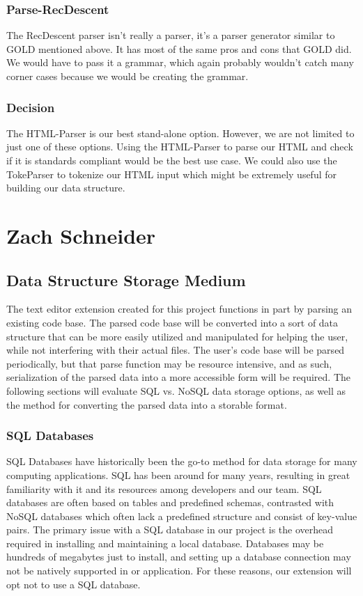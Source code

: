 \documentclass[letterpaper,10pt,titlepage,draftclsnofoot,onecolumn,onesided] {IEEEtran}
\begin{document}
\subsubsection{Parse-RecDescent}
The RecDescent parser isn't really a parser, it's a parser generator similar to GOLD mentioned above.
It has most of the same pros and cons that GOLD did. 
We would have to pass it a grammar, which again probably wouldn't catch many corner cases because we would be creating the grammar.
\cite{recdescent}

\subsubsection{Decision}
The HTML-Parser is our best stand-alone option.
However, we are not limited to just one of these options.
Using the HTML-Parser to parse our HTML and check if it is standards compliant would be the best use case.
We could also use the TokeParser to tokenize our HTML input which might be extremely useful for building our data structure. 

\section{Zach Schneider}

\subsection{Data Structure Storage Medium}
The text editor extension created for this project functions in part by parsing an existing code base. The parsed code base will be converted into a sort of data structure that can be more easily utilized and manipulated for helping the user, while not interfering with their actual files. The user's code base will be parsed periodically, but that parse function may be resource intensive, and as such, serialization of the parsed data into a more accessible form will be required. The following sections will evaluate SQL vs. NoSQL data storage options, as well as the method for converting the parsed data into a storable format.

\subsubsection{SQL Databases}
SQL Databases have historically been the go-to method for data storage for many computing applications. SQL has been around for many years, resulting in great familiarity with it and its resources among developers and our team. SQL databases are often based on tables and predefined schemas, contrasted with NoSQL databases which often lack a predefined structure and consist of key-value pairs. The primary issue with a SQL database in our project is the overhead required in installing and maintaining a local database. Databases may be hundreds of megabytes just to install, and setting up a database connection may not be natively supported in or application. For these reasons, our extension will opt not to use a SQL database. \cite{sql}
\end{document}
